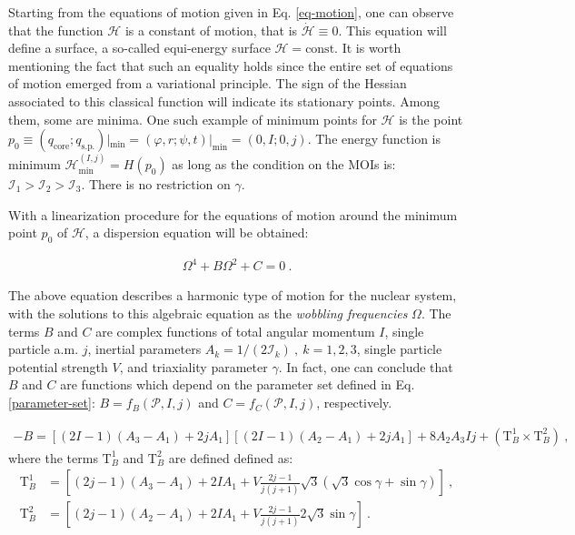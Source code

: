 \documentclass[11pt]{article}
\begin{document}
Starting from the equations of motion given in Eq. \ref{eq-motion}, one can observe that the function $\mathcal{H}$ is a constant of motion, that is $\dot{\mathcal{H}}\equiv0$. This equation will define a surface, a so-called equi-energy surface $\mathcal{H}=\text{const}$. It is worth mentioning the fact that such an equality holds since the entire set of equations of motion emerged from a variational principle. The sign of the Hessian associated to this classical function will indicate its stationary points. Among them, some are minima. One such example of minimum points for $\mathcal{H}$ is the point $p_0\equiv(q_\text{core};q_\text{s.p.})|_\text{min}=(\varphi,r;\psi,t)|_\text{min}=(0,I;0,j)$. The energy function is minimum $\mathcal{H}_\text{min}^{(I,j)}=H(p_0)$ as long as the condition on the MOIs is: $\mathcal{I}_1>\mathcal{I}_2>\mathcal{I}_3$. There is no restriction on $\gamma$.

With a linearization procedure for the equations of motion around the minimum point $p_0$ of $\mathcal{H}$, a dispersion equation will be obtained:

\begin{align}
    \Omega^4+B\Omega^2+C=0\ .
\end{align}

The above equation describes a harmonic type of motion for the nuclear system, with the solutions to this algebraic equation as the \emph{wobbling frequencies} $\Omega$. The terms $B$ and $C$ are complex functions of total angular momentum $I$, single particle a.m. $j$, inertial parameters $A_k=1/(2\mathcal{I}_k)\ ,\ k=1,2,3$, single particle potential strength $V$, and triaxiality parameter $\gamma$. In fact, one can conclude that $B$ and $C$ are functions which depend on the parameter set defined in Eq. \ref{parameter-set}: $B=f_B(\mathcal{P},I,j)$ and $C=f_C(\mathcal{P},I,j)$, respectively.

\begin{align}
 -B=\left[(2I-1)(A_3-A_1)+2jA_1\right]\left[(2I-1)(A_2-A_1)+2jA_1\right]+8A_2A_3Ij+\left(\text{T}_B^1\times\text{T}_B^2\right)\ ,
 \label{b_term}
 \end{align}
 where the terms $\text{T}_B^1$ and $\text{T}_B^2$ are defined defined as:
 \begin{align}
 \text{T}_B^1&=\left[(2j-1)(A_3-A_1)+2IA_1+V\frac{2j-1}{j(j+1)}\sqrt{3}(\sqrt{3}\cos\gamma+\sin\gamma)\right]\ , \nonumber \\
 \text{T}_B^2&=\left[(2j-1)(A_2-A_1)+2IA_1+V\frac{2j-1}{j(j+1)}2\sqrt{3}\sin\gamma\right]\ .
 \label{b_term-plus}
\end{align}
\end{document}
